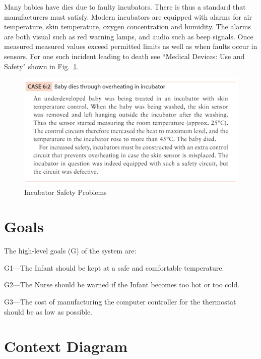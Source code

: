 \documentclass[fontsize=12pt,paper=letter,twoside]{scrartcl}
\begin{document}
Many babies have dies due to faulty incubators. There is thus a standard that manufacturers must satisfy. Modern incubators are equipped with alarms for air temperature, skin temperature, oxygen concentration and humidity. The alarms are both visual such as red warning lamps, and audio such as beep signals. Once measured measured values exceed permitted limits as well as when faults occur in sensors. For one such incident leading to death see ``Medical Devices: Use and Safety" shown in Fig.~\ref{fig:incubator}. 

\begin{figure}[!htb]
\begin{center}
\includegraphics[width=.9\textwidth]{images/incubator.png}
\end{center}
\caption{Incubator Safety Problems \cite[p98]{JM2007}}
\label{fig:incubator}
\end{figure}

\section{Goals}

The high-level goals (G) of the system are:

\begin{mylist}
\item G1---The Infant should be kept at a safe and comfortable temperature.

\item G2---The Nurse should be warned if the Infant becomes too hot or too cold.

\item G3---The cost of manufacturing the computer controller for the thermostat should be as low as possible.
\end{mylist}


\newpage
\section{Context Diagram}
 
\end{document}

